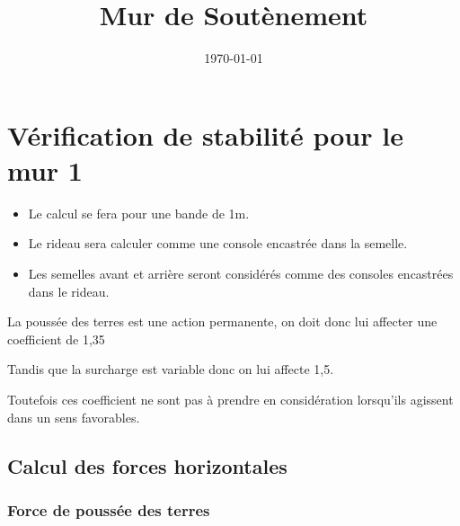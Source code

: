 \documentclass[12pt,a4paper]{report}
\title{Mur de Soutènement}
\author{}
\date{\today}
\begin{document}
	
	
	\tableofcontents
	
	\newpage
	
	
	
	
	
	
	
	
	
	\chapter{Vérification de stabilité pour le mur 1}
	
	\begin{tcolorbox}[colback=gray!20, colframe=black, title=Remarque]
		\begin{itemize}
			\item Le calcul se fera pour une bande de 1m.
			\item Le rideau sera calculer comme une console encastrée dans la semelle.
			\item Les semelles avant et arrière seront considérés comme des consoles encastrées dans le rideau.
		\end{itemize}
	\end{tcolorbox}
	
	
	\begin{tcolorbox}[colback=gray!20, colframe=black, title=Remarque]
		La poussée des terres est une action permanente, on doit donc lui affecter une coefficient de 1,35
		
		Tandis que la surcharge est variable donc on lui affecte 1,5.
		
		Toutefois ces coefficient ne sont pas à prendre en considération lorsqu'ils agissent dans un sens favorables.
	\end{tcolorbox}
	
	
	\section{Calcul des forces horizontales}
	
	\subsection{Force de poussée des terres}
	
\end{document}
